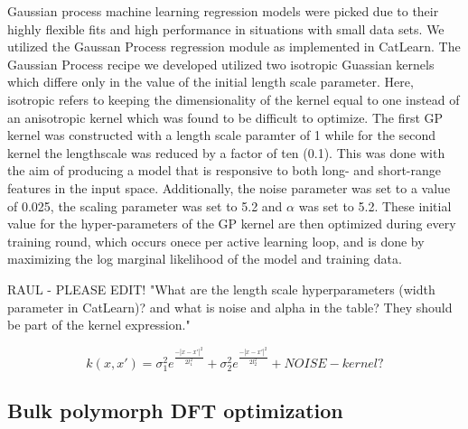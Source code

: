 %
%
Gaussian process machine learning regression models were picked due to their highly flexible fits and high performance in situations with small data sets.
%
We utilized the Gaussan Process regression module as implemented in CatLearn.
\cite{hansen2019atomistic,CatLearn_Repo}
%
The Gaussian Process recipe we developed utilized two isotropic Guassian kernels which differe only in the value of the initial length scale parameter.
%
Here, isotropic refers to keeping the dimensionality of the kernel equal to one instead of an anisotropic kernel which was found to be difficult to optimize.
%
The first GP kernel was constructed with a length scale paramter of 1 while for the second kernel the lengthscale was reduced by a factor of ten (0.1).
%
This was done with the aim of producing a model that is responsive to both long- and short-range features in the input space.
%
Additionally, the noise parameter was set to a value of \num{0.025}, the scaling parameter was set to \num{5.2} and $\alpha$ was set to 5.2.
%
These initial value for the hyper-parameters of the GP kernel are then optimized during every training round,
which occurs onece per active learning loop,
and is done by maximizing the log marginal likelihood of the model and training data.


RAUL - PLEASE EDIT! "What are the length scale hyperparameters (width parameter in CatLearn)? and what is noise and alpha in the table? They should be part of the kernel expression."

\begin{equation}
    k(x,x') = \sigma_1^ 2 e^{\frac{-|x-x'|^2}{2l_1^2}} + \sigma_2^ 2 e^{\frac{-|x-x'|^2}{2l_2^2}} + NOISE-kernel?
\end{equation}




\subsection{Bulk polymorph DFT optimization}  %


